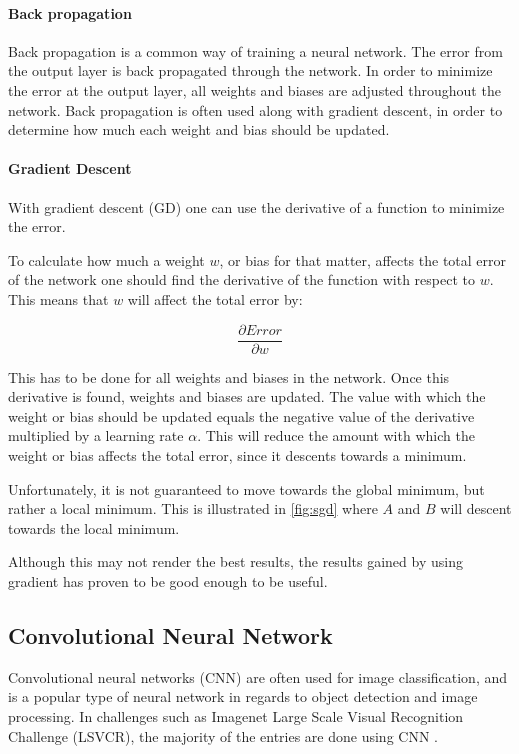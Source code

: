 \paragraph{Back propagation}
Back propagation is a common way of training a neural network.
The error from the output layer is back propagated through the network.
In order to minimize the error at the output layer, all weights and biases are adjusted throughout the network.
Back propagation is often used along with gradient descent, in order to determine how much each weight and bias should be updated.

\paragraph{Gradient Descent}
With gradient descent (GD) one can use the derivative of a function to minimize the error.

To calculate how much a weight $w$, or bias for that matter, affects the total error of the network one should find the derivative of the function with respect to $w$.
This means that $w$ will affect the total error by:

$$\frac{\partial Error}{\partial w}$$

This has to be done for all weights and biases in the network.
Once this derivative is found, weights and biases are updated.
The value with which the weight or bias should be updated equals the negative value of the derivative multiplied by a learning rate $\alpha$.
This will reduce the amount with which the weight or bias affects the total error, since it descents towards a minimum.

Unfortunately, it is not guaranteed to move towards the global minimum, but rather a local minimum.
This is illustrated in \autoref{fig:sgd} where $A$ and $B$ will descent towards the local minimum.


Although this may not render the best results, the results gained by using gradient has proven to be good enough to be useful.

\subsection{Convolutional Neural Network}
\label{sec:cnn}
Convolutional neural networks (CNN) are often used for image classification, and is a popular type of neural network in regards to object detection and image processing.
In challenges such as Imagenet Large Scale Visual Recognition Challenge (LSVCR), the majority of the entries are done using CNN \cite{ILSVRC_Results}. 

